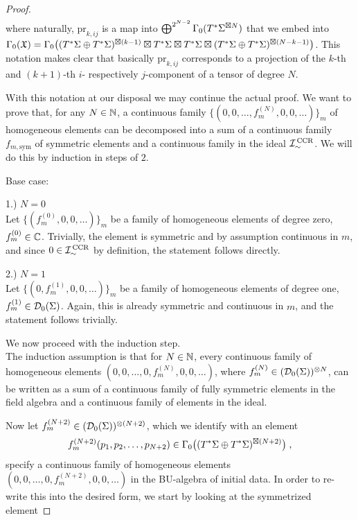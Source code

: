 \begin{proof}
\begin{align}
\end{align}
where naturally, $\text{pr}_{k,ij}$ is a map into $\bigoplus^{2^{N-2}} \Gamma_0 (T^*\Sigma^{\boxtimes N})$ that we embed into $\Gamma_0(\mathfrak{X}) = \Gamma_0\big( (T^*\Sigma \oplus T^*\Sigma)^{\boxtimes (k-1)} \boxtimes T^*\Sigma \boxtimes T^*\Sigma \boxtimes (T^*\Sigma \oplus T^*\Sigma)^{\boxtimes(N-k-1)} \big)$. This notation makes clear that basically $\text{pr}_{k,ij}$ corresponds to a projection of the $k$-th and $(k+1)$-th $i$- respectively $j$-component of a tensor of degree $N$.\par
%
%
%
%
With this notation at our disposal we may continue the actual proof. We want to prove that, for any $N \in \mathbb{N}$, a continuous family $\big\{ (0,0,\dots,f^{(N)}_m,0,0,\dots) \big\}_m$  of homogeneous elements can be decomposed into a sum of a continuous family $f_{m,\text{sym}}$ of symmetric elements and a continuous family in the ideal ${\mathcal{I}}_{\sim}^\text{\,CCR}$. We will do this by induction in steps of $2$.\par
Base case:\par
1.) $N=0$ \\
Let $\big\{(f_m^{(0)} , 0 , 0 ,\dots)\big\}_m$ be a family of homogeneous elements of degree zero, $f_m^{(0)} \in \mathbb{C}$. Trivially, the element is symmetric and by assumption continuous in $m$, and since $0 \in {\mathcal{I}}_{\sim}^\text{\,CCR}$ by definition, the statement follows directly. \par
2.) $N=1$\\
Let $\big\{(0,f_m^{(1)} , 0 , 0 ,\dots)\big\}_m$ be a family of homogeneous elements of degree one, $f_m^{(1)} \in \mathcal{D}_{0}(\Sigma)$. Again, this is already symmetric and continuous in $m$, and the statement follows trivially. \par
We now proceed with the induction step.\\
The induction assumption is that for $N\in \mathbb{N}$, every continuous family of homogeneous elements $(0,0,\dots,0,f_m^{(N)},0,0,\dots )$, where $f_m^{(N)} \in (\mathcal{D}_{0}(\Sigma))^{\otimes N}$, can be written as a sum of a continuous family of fully symmetric elements in the field algebra and a continuous family of elements in the ideal. \par
%
%
Now let $f_m^{(N+2)} \in (\mathcal{D}_{0}(\Sigma))^{\otimes(N+2)}$, which we identify with an element
\begin{align}
f_m^{(N+2)} (p_1,p_2,\dots,p_{N+2}) \in \Gamma_0\big( (T^*\Sigma \oplus T^*\Sigma)^{\boxtimes (N+2)} \big) \;,
\end{align}specify a continuous family of homogeneous elements $(0,0,\dots,0,f^{(N+2)}_m ,0,0,\dots)$ in the BU-algebra of initial data. In order to re-write this into the desired form, we start by looking at the symmetrized element

\end{proof}
